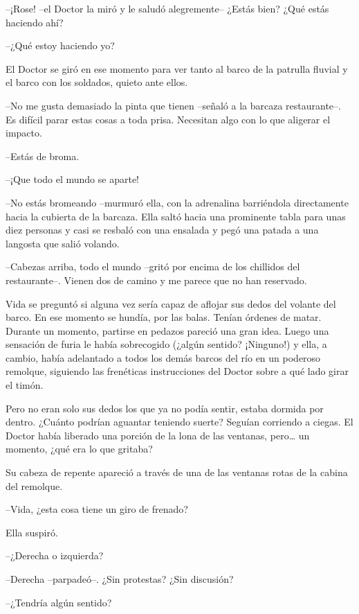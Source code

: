 {--¡Rose! --el Doctor la miró y le saludó alegremente-- ¿Estás bien?
¿Qué estás haciendo ahí?}

{--¿Qué estoy haciendo yo?}

{El Doctor se giró en ese momento para ver tanto al barco de la patrulla
fluvial y el barco con los soldados, quieto ante ellos.}

{--No me gusta demasiado la pinta que tienen --señaló a la barcaza
 restaurante--. Es difícil parar estas cosas a toda prisa. Necesitan algo
con lo que aligerar el impacto.}

{--Estás de broma.}

{--¡Que todo el mundo se aparte!}

{--No estás bromeando --murmuró ella, con la adrenalina barriéndola
 directamente hacia la cubierta de la barcaza. Ella saltó hacia una
 prominente tabla para unas diez personas y casi se resbaló con una
ensalada y pegó una patada a una langosta que salió volando.}

{--Cabezas arriba, todo el mundo --gritó por encima de los chillidos del
restaurante--. Vienen dos de camino y me parece que no han reservado.}

\mbox{}

{Vida se preguntó si alguna vez sería capaz de aflojar sus dedos del
 volante del barco. En ese momento se hundía, por las balas. Tenían
 órdenes de matar. Durante un momento, partirse en pedazos pareció una
 gran idea. Luego una sensación de furia le había sobrecogido (¿algún
 sentido? ¡Ninguno!) y ella, a cambio, había adelantado a todos los demás
 barcos del río en un poderoso remolque, siguiendo las frenéticas
instrucciones del Doctor sobre a qué lado girar el timón.}

{Pero no eran solo sus dedos los que ya no podía sentir, estaba dormida
 por dentro. ¿Cuánto podrían aguantar teniendo suerte? Seguían corriendo
 a ciegas. El Doctor había liberado una porción de la lona de las
 ventanas, pero\ldots{} un momento, ¿qué era lo que gritaba?}

{Su cabeza de repente apareció a través de una de las ventanas rotas de
la cabina del remolque.}

{--Vida, ¿esta cosa tiene un giro de frenado?}

{Ella suspiró.}

{--¿Derecha o izquierda?}

{--Derecha --parpadeó--. ¿Sin protestas? ¿Sin discusión?}

{--¿Tendría algún sentido?}


